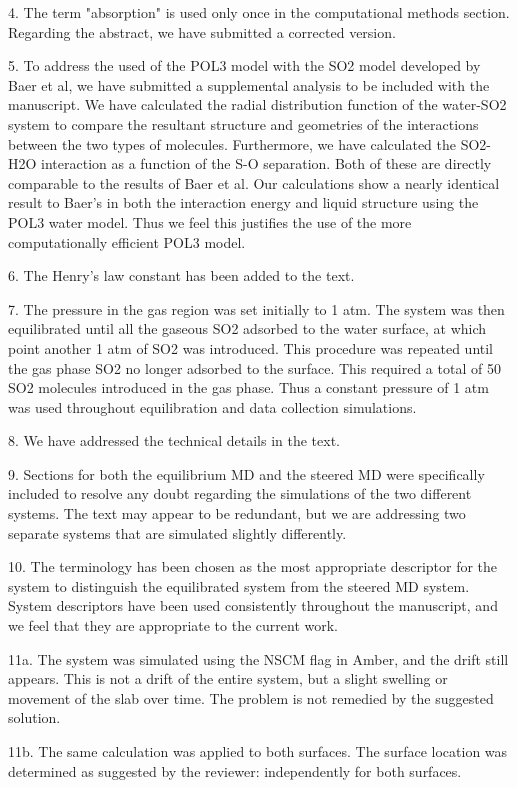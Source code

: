 4. The term "absorption" is used only once in the computational methods section. Regarding the abstract, we have submitted a corrected version.

5. To address the used of the POL3 model with the SO2 model developed by Baer et al, we have submitted a supplemental analysis to be included with the manuscript. We have calculated the radial distribution function of the water-SO2 system to compare the resultant structure and geometries of the interactions between the two types of molecules. Furthermore, we have calculated the SO2-H2O interaction as a function of the S-O separation. Both of these are directly comparable to the results of Baer et al. Our calculations show a nearly identical result to Baer's in both the interaction energy and liquid structure using the POL3 water model. Thus we feel this justifies the use of the more computationally efficient POL3 model.

6. The Henry's law constant has been added to the text.

7. The pressure in the gas region was set initially to 1 atm. The system was then equilibrated until all the gaseous SO2 adsorbed to the water surface, at which point another 1 atm of SO2 was introduced. This procedure was repeated until the gas phase SO2 no longer adsorbed to the surface. This required a total of 50 SO2 molecules introduced in the gas phase. Thus a constant pressure of 1 atm was used throughout equilibration and data collection simulations.

8. We have addressed the technical details in the text.

9. Sections for both the equilibrium MD and the steered MD were specifically included to resolve any doubt regarding the simulations of the two different systems. The text may appear to be redundant, but we are addressing two separate systems that are simulated slightly differently.

10. The terminology has been chosen as the most appropriate descriptor for the system to distinguish the equilibrated system from the steered MD system. System descriptors have been used consistently throughout the manuscript, and we feel that they are appropriate to the current work.

11a. The system was simulated using the NSCM flag in Amber, and the drift still appears. This is not a drift of the entire system, but a slight swelling or movement of the slab over time. The problem is not remedied by the suggested solution.

11b. The same calculation was applied to both surfaces. The surface location was determined as suggested by the reviewer: independently for both surfaces.

